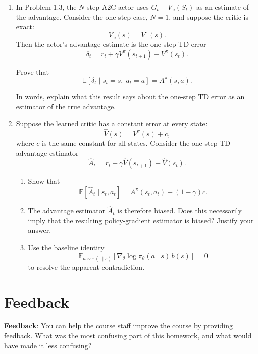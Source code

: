 \documentclass[12pt]{article}
\begin{document}
\begin{enumerate}[leftmargin=*]
  \item In Problem 1.3, the $N$-step A2C actor uses
  $G_t - V_\omega(S_t)$ as an estimate of the advantage. Consider the
  one-step case, $N=1$, and suppose the critic is exact:
  \[
    V_\omega(s) = V^\pi(s).
  \]
  Then the actor's advantage estimate is the one-step TD error
  \[
    \delta_t
    =
    r_t
    +
    \gamma V^\pi(s_{t+1})
    -
    V^\pi(s_t).
  \]

  Prove that
  \[
    \mathbb{E}
    \left[
      \delta_t
      \mid s_t=s,\; a_t=a
    \right]
    =
    A^\pi(s,a).
  \]

  In words, explain what this result says about the one-step TD error as an
  estimator of the true advantage.

  \item Suppose the learned critic has a constant error at every state:
  \[
    \hat{V}(s) = V^\pi(s) + c,
  \]
  where $c$ is the same constant for all states. Consider the one-step TD
  advantage estimator
  \[
    \hat{A}_t
    =
    r_t
    +
    \gamma \hat{V}(s_{t+1})
    -
    \hat{V}(s_t).
  \]

  \begin{enumerate}
    \item Show that
    \[
      \mathbb{E}
      \left[
        \hat{A}_t
        \mid s_t,a_t
      \right]
      =
      A^\pi(s_t,a_t)
      -
      (1-\gamma)c.
    \]

    \item The advantage estimator $\hat{A}_t$ is therefore biased. Does this
    necessarily imply that the resulting policy-gradient estimator is biased?
    Justify your answer.

    \item Use the baseline identity
    \[
      \mathbb{E}_{a \sim \pi(\cdot \mid s)}
      \left[
        \nabla_\theta \log \pi_\theta(a \mid s)\, b(s)
      \right]
      = 0
    \]
    to resolve the apparent contradiction.
  \end{enumerate}

\end{enumerate}


\newpage
\section*{Feedback}

\textbf{Feedback}: You can help the course staff improve the course by providing feedback. 
What was the most confusing part of this homework, and what would have made it less confusing?
\end{document}
